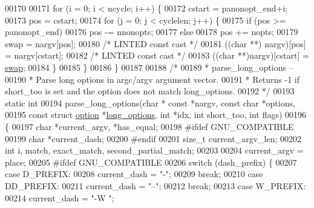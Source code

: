 \begin{DoxyCode}
{{{{{{{{{{{00170 
00171     \textcolor{keywordflow}{for} (i = 0; i < ncycle; i++) \{
00172         cstart = panonopt\_end+i;
00173         pos = cstart;
00174         \textcolor{keywordflow}{for} (j = 0; j < cyclelen; j++) \{
00175             \textcolor{keywordflow}{if} (pos >= panonopt\_end)
00176                 pos -= nnonopts;
00177             \textcolor{keywordflow}{else}
00178                 pos += nopts;
00179             swap = nargv[pos];
00180             \textcolor{comment}{/* LINTED const cast */}
00181             ((\textcolor{keywordtype}{char} **) nargv)[pos] = nargv[cstart];
00182             \textcolor{comment}{/* LINTED const cast */}
00183             ((\textcolor{keywordtype}{char} **)nargv)[cstart] = \hyperlink{endian_8c_a3ca5ecd34b04d6a243c054ac3a57f68d}{swap};
00184         \}
00185     \}
00186 \}
00187 
00188 \textcolor{comment}{/*}
00189 \textcolor{comment}{ * parse\_long\_options --}
00190 \textcolor{comment}{ *  Parse long options in argc/argv argument vector.}
00191 \textcolor{comment}{ * Returns -1 if short\_too is set and the option does not match long\_options.}
00192 \textcolor{comment}{ */}
00193 \textcolor{keyword}{static} \textcolor{keywordtype}{int}
00194 parse\_long\_options(\textcolor{keywordtype}{char} * \textcolor{keyword}{const} *nargv, \textcolor{keyword}{const} \textcolor{keywordtype}{char} *options,
00195     \textcolor{keyword}{const} \textcolor{keyword}{struct} \hyperlink{structoption}{option} *\hyperlink{structlong__options}{long\_options}, \textcolor{keywordtype}{int} *idx, \textcolor{keywordtype}{int} short\_too, \textcolor{keywordtype}{int} flags)
00196 \{
00197     \textcolor{keywordtype}{char} *current\_argv, *has\_equal;
00198 \textcolor{preprocessor}{#ifdef GNU\_COMPATIBLE}
00199     \textcolor{keywordtype}{char} *current\_dash;
00200 \textcolor{preprocessor}{#endif}
00201     \textcolor{keywordtype}{size\_t} current\_argv\_len;
00202     \textcolor{keywordtype}{int} i, match, exact\_match, second\_partial\_match;
00203 
00204     current\_argv = place;
00205 \textcolor{preprocessor}{#ifdef GNU\_COMPATIBLE}
00206     \textcolor{keywordflow}{switch} (dash\_prefix) \{
00207         \textcolor{keywordflow}{case} D\_PREFIX:
00208             current\_dash = \textcolor{stringliteral}{"-"};
00209             \textcolor{keywordflow}{break};
00210         \textcolor{keywordflow}{case} DD\_PREFIX:
00211             current\_dash = \textcolor{stringliteral}{"--"};
00212             \textcolor{keywordflow}{break};
00213         \textcolor{keywordflow}{case} W\_PREFIX:
00214             current\_dash = \textcolor{stringliteral}{"-W "};
}}}}}}}}}}}
\end{DoxyCode}
